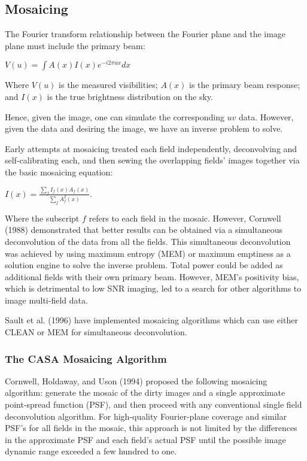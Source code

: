 \subsection{Mosaicing}
\label{subsection:synth.im.mosaic}

The Fourier transform relationship between the Fourier plane and
the image plane must include the primary beam:

$ V(u) = \int A(x) I(x) e^{-i2 \pi u x} dx $

Where $V(u)$ is the measured visibilities; $A(x)$ is the primary beam
response; and $I(x)$ is the true brightness distribution on the sky.

Hence, given the image, one can simulate the corresponding $uv$
data.  However, given the data and desiring the image, we have an
inverse problem to solve.

Early attempts at mosaicing treated each field independently,
deconvolving and self-calibrating each, and then sewing the overlapping
fields' images together via the basic mosaicing equation:

$I(x) = \frac{ \sum_f I_{f}(x)  A_{f}(x) } { \sum_f A^{2}_{f}(x) }.$

Where the subscript $f$ refers to each field in the mosaic.  However,
Cornwell (1988) demonstrated that better results can be obtained via a
simultaneous deconvolution of the data from all the fields.  This
simultaneous deconvolution was achieved by using maximum entropy (MEM)
or maximum emptiness as a solution engine to solve the inverse
problem.  Total power could be added as additional fields with their
own primary beam.  However, MEM's positivity bias, which is
detrimental to low SNR imaging, led to a search for other algorithms
to image multi-field data.

Sault et al. (1996) have implemented mosaicing algorithms which
can use either CLEAN or MEM for simultaneous deconvolution.

\subsubsection{The CASA Mosaicing Algorithm}
\label{subsubsection:synth.im.mos.algorithm}

Cornwell, Holdaway, and Uson (1994) proposed the following mosaicing
algorithm: generate the mosaic of the dirty images and a single
approximate point-spread function (PSF), and then proceed with any
conventional single field deconvolution algorithm.  For high-quality
Fourier-plane coverage and similar PSF's for all fields in the mosaic,
this approach is not limited by the differences in the approximate PSF
and each field's actual PSF until the possible image dynamic range
exceeded a few hundred to one.

